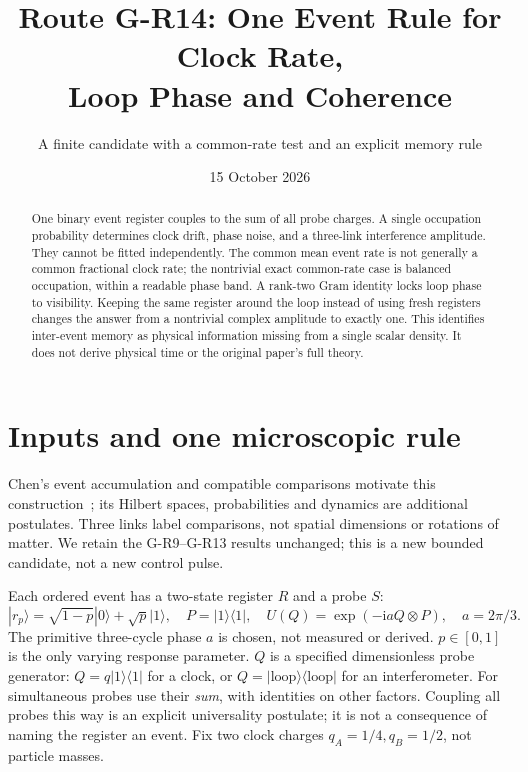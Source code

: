 \documentclass[11pt,a4paper]{article}
\title{Route G-R14: One Event Rule for Clock Rate,\\Loop Phase and Coherence}
\author{A finite candidate with a common-rate test and an explicit memory rule}
\date{15 October 2026}
\newcommand{\ii}{\mathrm i}
\newcommand{\ket}[1]{|#1\rangle}
\newcommand{\bra}[1]{\langle#1|}
\begin{document}
\maketitle
\begin{abstract}
One binary event register couples to the sum of all probe charges.
A single occupation probability determines clock drift, phase noise,
and a three-link interference amplitude. They cannot be fitted independently.
The common mean event rate is not generally a common fractional clock rate;
the nontrivial exact common-rate case is balanced occupation, within a
readable phase band. A rank-two Gram identity locks loop phase to visibility.
Keeping the same register around the loop instead of using fresh registers
changes the answer from a nontrivial complex amplitude to exactly one.
This identifies inter-event memory as physical information missing from a
single scalar density. It does not derive physical time or the original
paper's full theory.
\end{abstract}

\section{Inputs and one microscopic rule}
Chen's event accumulation and compatible comparisons motivate this
construction~\cite{chen}; its Hilbert spaces, probabilities and dynamics
are additional postulates. Three links label comparisons, not spatial
dimensions or rotations of matter. We retain the G-R9--G-R13 results
unchanged; this is a new bounded candidate, not a new control pulse.

Each ordered event has a two-state register $R$ and a probe $S$:
\begin{equation}
 \ket{r_p}=\sqrt{1-p}\ket0+\sqrt p\ket1,\quad
 P=\ket1\bra1,\quad
 U(Q)=\exp(-\ii a Q\otimes P),\quad a=2\pi/3.\label{rule}
\end{equation}
The primitive three-cycle phase $a$ is chosen, not measured or derived.
$p\in[0,1]$ is the only varying response parameter. $Q$ is a specified
dimensionless probe generator: $Q=q\ket1\bra1$ for a clock, or
$Q=\ket{\mathrm{loop}}\bra{\mathrm{loop}}$ for an interferometer.
For simultaneous probes use their \emph{sum}, with identities on other
factors. Coupling all probes this way is an explicit universality
postulate; it is not a consequence of naming the register an event.
Fix two clock charges $q_A=1/4,q_B=1/2$, not particle masses.
\end{document}
